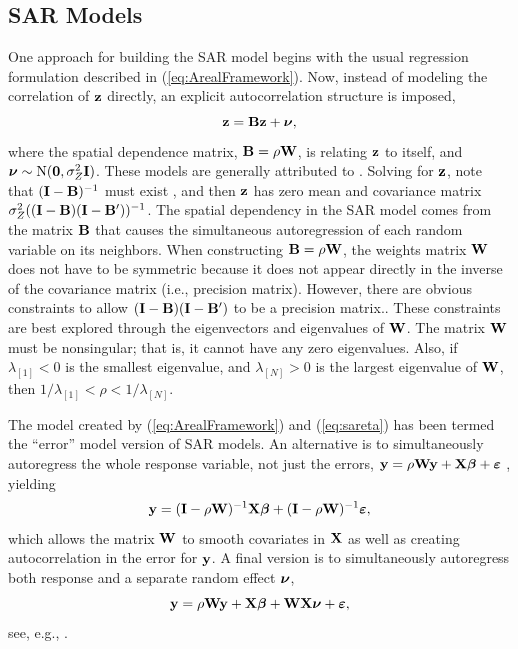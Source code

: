 \documentclass[11pt, titlepage]{article}\usepackage[]{graphicx}\usepackage[]{color}
\begin{document}

\subsection*{SAR Models}

One approach for building the SAR model begins with the usual regression formulation described in (\ref{eq:ArealFramework}). Now, instead of modeling the correlation of $\mathbf{z}$ directly, an explicit autocorrelation structure is imposed,
\begin{equation} \label{eq:sareta}
  \mathbf{z} = \mathbf{B}\mathbf{z} + \mbox{\boldmath $\nu$},
\end{equation}
where the spatial dependence matrix, $\mathbf{B}=\rho\mathbf{W}$, is relating $\mathbf{z}$ to itself, and $\mbox{\boldmath $\nu$} \sim \textrm{N}(\mathbf{0},\sigma^2_Z \mathbf{I})$. These models are generally attributed to \citet{Whit:stat:1954}. Solving for $\mathbf{z}$, note that $(\mathbf{I} - \mathbf{B})^{-1}$ must exist \citep{Cres:stat:1993, Wall:Gotw:appl:2004}, and then $\mathbf{z}$ has zero mean and covariance matrix $\sigma^2_Z((\mathbf{I} - \mathbf{B})(\mathbf{I} - \mathbf{B}^{\prime}))^{-1}$. The spatial dependency in the SAR model comes from the matrix $\mathbf{B}$ that causes the simultaneous autoregression of each random variable on its neighbors. When constructing $\mathbf{B} = \rho\mathbf{W}$, the weights matrix $\mathbf{W}$ does not have to be symmetric because it does not appear directly in the inverse of the covariance matrix (i.e., precision matrix).  However, there are obvious constraints to allow $(\mathbf{I} - \mathbf{B})(\mathbf{I} - \mathbf{B}^{\prime})$ to be a precision matrix..  These constraints are best explored through the eigenvectors and eigenvalues of $\mathbf{W}$.  The matrix $\mathbf{W}$ must be nonsingular; that is, it cannot have any zero eigenvalues. Also, if $\lambda_{[1]} < 0$ is the smallest eigenvalue, and $\lambda_{[N]} > 0$ is the largest eigenvalue of $\mathbf{W}$, then $1/\lambda_{[1]} < \rho < 1/\lambda_{[N]}$.

The model created by (\ref{eq:ArealFramework}) and (\ref{eq:sareta}) has been termed the ``error'' model version of SAR models.  An alternative is to simultaneously autoregress the whole response variable, not just the errors, $\mathbf{y}= \rho\mathbf{W}\mathbf{y} + \mathbf{X}\mbox{\boldmath $\beta$} + \mbox{\boldmath $\varepsilon$}$ \citep{Anse:spat:1988}, yielding
\begin{equation} \label{eq:SARlagResp}
   \mathbf{y} = (\mathbf{I} - \rho\mathbf{W})^{-1}\mathbf{X}\mbox{\boldmath $\beta$} + (\mathbf{I} - \rho\mathbf{W})^{-1}\mbox{\boldmath $\varepsilon$}, 
\end{equation}
which allows the matrix $\mathbf{W}$ to smooth covariates in $\mathbf{X}$ as well as creating autocorrelation in the error for $\mathbf{y}$. A final version is to simultaneously autoregress both response and a separate random effect $\mbox{\boldmath $\nu$}$, 
\begin{equation} \label{eq:SARlagMix}
  \mathbf{y} = \rho\mathbf{W}\mathbf{y} + \mathbf{X}\mbox{\boldmath $\beta$} + \mathbf{W}\mathbf{X}\mbox{\boldmath $\nu$} + \mbox{\boldmath $\varepsilon$},
\end{equation}
see, e.g., \citet{Kiss:Carl:spat:2008}.
\end{document}
